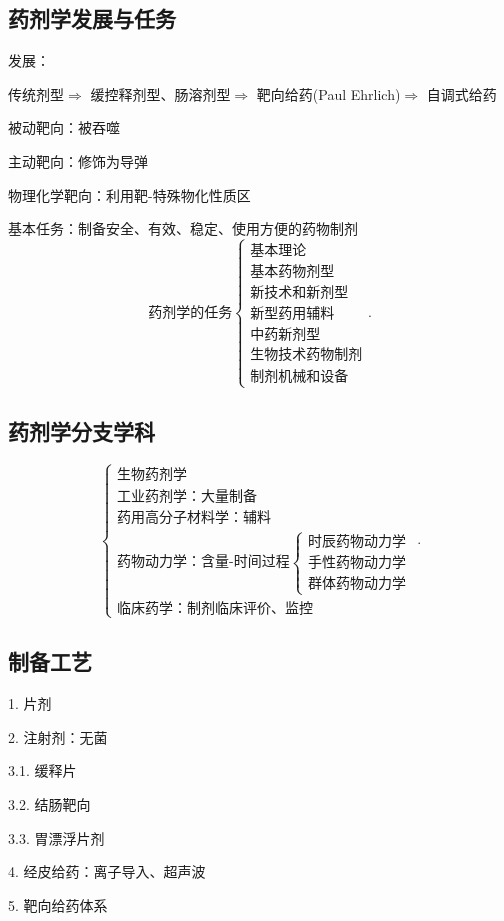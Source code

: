 \subsection{药剂学发展与任务}%
\label{sub:药剂学发展与任务}
发展：

传统剂型$\Rightarrow $ 缓控释剂型、肠溶剂型$\Rightarrow $ 靶向给药(Paul Ehrlich)$\Rightarrow $ 自调式给药
\begin{notation}
    被动靶向：被吞噬

    主动靶向：修饰为导弹

    物理化学靶向：利用靶-特殊物化性质区
\end{notation}
基本任务：制备安全、有效、稳定、使用方便的药物制剂
\[
    \text{药剂学的任务}
    \begin{cases}
        \text{基本理论}\\
        \text{基本药物剂型}\\
        \text{新技术和新剂型}\\
        \text{新型药用辅料}\\
        \text{中药新剂型}\\
        \text{生物技术药物制剂}\\
        \text{制剂机械和设备}
    \end{cases}
.\] 
\subsection{药剂学分支学科}%
\label{sub:药剂学分支学科}
 \[
    \begin{cases}
        \text{生物药剂学}\\
        \text{工业药剂学：大量制备}\\
        \text{药用高分子材料学：辅料}\\
        \text{药物动力学：含量-时间过程}\begin{cases}
            \text{时辰药物动力学}\\
            \text{手性药物动力学}\\
            \text{群体药物动力学}
        \end{cases}\\
        \text{临床药学：制剂临床评价、监控}
    \end{cases}
.\] 
\subsection{制备工艺}%
\label{sub:制备工艺}
1. 片剂

2. 注射剂：无菌

3.1. 缓释片

3.2. 结肠靶向

3.3. 胃漂浮片剂

4. 经皮给药：离子导入、超声波

5. 靶向给药体系
